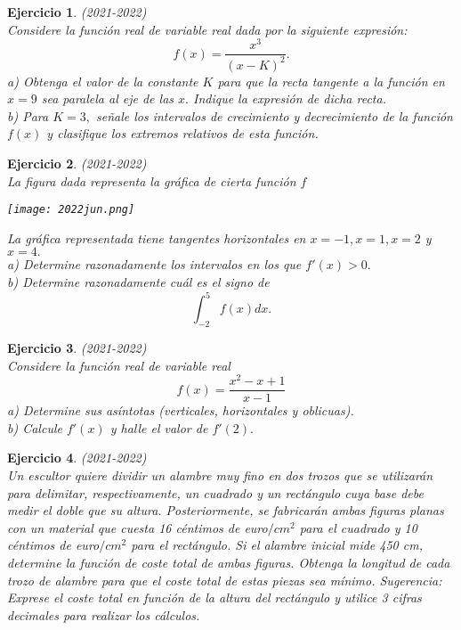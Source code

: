 \documentclass[12pt, a4paper]{amsart}
\newtheorem{ejer}{Ejercicio}
\begin{document}
\begin{ejer}\em (2021-2022)\\
Considere la función real de variable real dada por la siguiente expresión:
\[f(x)= \frac{x^3}{(x-K)^2}.\]
a) Obtenga el valor de la constante $K$ para que la recta tangente a la función en $x = 9$ sea paralela al eje de las $x.$ Indique la expresión de dicha recta.\\
b) Para $K = 3,$ señale los intervalos de crecimiento y decrecimiento de la función $f(x)$ y clasifique los extremos relativos de esta función.
\end{ejer}

\begin{ejer}\em (2021-2022)\\
La figura dada representa la gráfica de cierta función $f$
\begin{center}
\texttt{[image: 2022jun.png]}
\end{center}
La gráfica representada tiene tangentes horizontales en $x = -1, x = 1, x = 2$ y $x = 4.$\\
a) Determine razonadamente los intervalos en los que $f'(x) > 0.$\\
b) Determine razonadamente cuál es el signo de
\[\int_{-2}^5 f(x)dx.\]
\end{ejer}

\begin{ejer}\em (2021-2022)\\
Considere la función real de variable real
\[
f(x) = \frac{x^2-x+1}{x-1}
\]
a) Determine sus asíntotas (verticales, horizontales y oblicuas).\\
b) Calcule $f'(x)$ y halle el valor de $f'(2).$
\end{ejer}

\begin{ejer}\em (2021-2022)\\
Un escultor quiere dividir un alambre muy fino en dos trozos que se utilizarán para delimitar, respectivamente, un cuadrado y un rectángulo cuya base debe medir el doble que su altura. Posteriormente, se fabricarán ambas figuras planas con un material que cuesta 16 céntimos de euro$/cm^2$
para el cuadrado y 10 céntimos de euro$/cm^2$ para el rectángulo. Si el alambre inicial mide 450 cm, determine la función de coste total de ambas figuras. Obtenga la longitud de cada trozo de alambre para que el coste total de estas piezas sea mínimo.
Sugerencia: Exprese el coste total en función de la altura del rectángulo y utilice 3 cifras decimales para realizar los cálculos.
\end{ejer}
\end{document}
